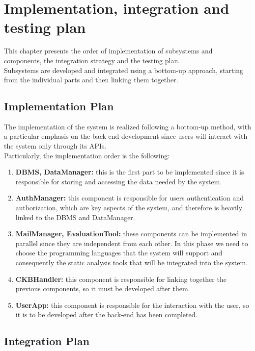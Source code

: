 \chapter{Implementation, integration and testing plan}
This chapter presents the order of implementation of subsystems and components, 
the integration strategy and the testing plan.\\
Subsystems are developed and integrated using a bottom-up approach, starting from the 
individual parts and then linking them together.\\

\section{Implementation Plan}
The implementation of the system is realized following a bottom-up method, with a particular 
emphasis on the back-end development since users will interact with the system only through 
its APIs.\\
Particularly, the implementation order is the following:
\begin{enumerate}
    \item \textbf{DBMS, DataManager:} this is the first part to be implemented since it is responsible 
    for storing and accessing the data needed by the system.
    \item \textbf{AuthManager:} this component is responsible for users authentication and authorization, 
    which are key aspects of the system, and therefore is heavily linked to the DBMS and DataManager.
    \item \textbf{MailManager, EvaluationTool:} these components can be implemented in parallel since they are 
    independent from each other. In this phase we need to choose the programming languages that the system will
    support and consequently the static analysis tools that will be integrated into the system.    
    \item \textbf{CKBHandler:} this component is responsible for linking together the previous components, so 
    it must be developed after them.
    \item \textbf{UserApp:} this component is responsible for the interaction with the user, so it is to be 
    developed after the back-end has been completed.
\end{enumerate}
\section{Integration Plan}

